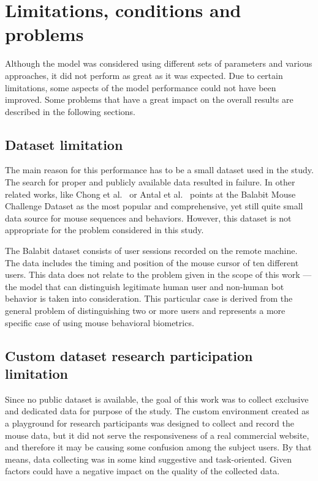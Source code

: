 \section{Limitations, conditions and problems}\label{sec:limitations-conditions-problems}
Although the model was considered using different sets of parameters and various approaches, it did not perform as great as it was expected.
Due to certain limitations, some aspects of the model performance could not have been improved.
Some problems that have a great impact on the overall results are described in the following sections.

\subsection{Dataset limitation}\label{subsec:dataset-limitation}
The main reason for this performance has to be a small dataset used in the study.
The search for proper and publicly available data resulted in failure.
In other related works, like Chong et al.~\cite{Main} or Antal et al.~\cite{antal2019intrusion} points at the Balabit Mouse Challenge Dataset as the most popular and comprehensive, yet still quite small data source for mouse sequences and behaviors.
However, this dataset is not appropriate for the problem considered in this study.

The Balabit dataset consists of user sessions recorded on the remote machine.
The data includes the timing and position of the mouse cursor of ten different users.
This data does not relate to the problem given in the scope of this work --- the model that can distinguish legitimate human user and non-human bot behavior is taken into consideration.
This particular case is derived from the general problem of distinguishing two or more users and represents a more specific case of using mouse behavioral biometrics.

\subsection{Custom dataset research participation limitation}\label{subsec:custom-dataset-research}
Since no public dataset is available, the goal of this work was to collect exclusive and dedicated data for purpose of the study.
The custom environment created as a playground for research participants was designed to collect and record the mouse data, but it did not serve the responsiveness of a real commercial website, and therefore it may be causing some confusion among the subject users.
By that means, data collecting was in some kind suggestive and task-oriented.
Given factors could have a negative impact on the quality of the collected data.

